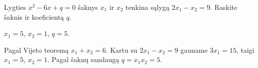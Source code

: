 \begin{salyga}
Lygties $x^2 - 6x + q = 0$ šaknys $x_1$ ir $x_2$ tenkina sąlygą $2x_1 - x_2 = 9$. Raskite šaknis ir koeficientą $q$.
\end{salyga}

\begin{atsakymas}
$x_1=5$, $x_2=1$, $q=5$.
\end{atsakymas}

\begin{sprendimas}
Pagal Vijeto teoremą $x_1+x_2=6$. Kartu su $2x_1-x_2=9$ gauname $3x_1=15$, taigi $x_1=5$, $x_2=1$. Pagal šaknų sandaugą $q=x_1x_2=5$.
\end{sprendimas}
